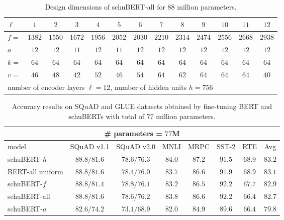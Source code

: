 \documentclass[11pt,a4paper]{article}
\begin{document}
\begin{table}[h]
\centering
\begin{tabular}{l|cccccccccccc}
\hline
$\ell$ & $1$ & $2$ & $3$ & $4$ & $5$ & $6$& $7$ &$8$ & $9$ & $10$ & $11$ & $12$\\
\hline
$f = $ & $1382$ & $1550$ & $1672$ & $1956$ & $2052$ & $2030$ & $2210$ & $2314$ & $2474$ & $2556$ & $2668$ & $2938$\\
$a = $ & $12$ & $12$ & $11$ & $12$ & $11$ & $12$ & $12$ & $12$ & $12$ & $12$ & $12$ & $12$ \\
$k= $  & $64$ & $64$ & $64$ & $64$ & $64$ & $64$ & $64$ & $64$ & $64$ & $64$ & $64$ & $64$\\
$v = $ & $46$ & $48$ & $42$ & $52$ & $46$ & $54$ & $64$ & $62$ & $64$ & $64$ & $64$ & $40$\\
\hline
\multicolumn{12}{l}{number of encoder layers $\ell=12$, number of hidden units $h=756$}\\
\end{tabular}
\caption{\label{tab:arch_88} Design dimensions of schuBERT-all for $88$ million parameters.}
\end{table}
\begin{table}[h]
\centering
\begin{tabular}{lcccccc|c}
\multicolumn{8}{c}{\# parameters = $77$M}\\
\hline
model & SQuAD v1.1 & SQuAD v2.0 & MNLI & MRPC & SST-2 & RTE & Avg\\
\hline
schuBERT-$h$ & $\pmb{88.8/81.6}$ &$\pmb{78.6/76.3}$& $\pmb{84.0}$ & $\pmb{87.2}$ & $91.5$ & $\pmb{68.9}$ & $\pmb{83.2}$\\
BERT-all uniform & $88.8/81.6$ &$78.4/76.0$& $83.7$ & $86.6$ & $91.9$ & $68.9$ & $83.1$\\
schuBERT-$f$ & $88.8/81.4$ &$78.8/76.1$& $83.2$ & $86.5$ & $\pmb{92.2}$ & $67.7$ & $82.9$\\
schuBERT-all & $88.8/81.6$ &$78.6/76.2$& $83.8$ & $86.6$ & $92.2$ & $66.4$ & $82.7$\\
schuBERT-$a$ & $82.6/74.2$ &$73.1/68.9$& $82.0$ & $84.9$ & $89.6$ & $66.4$ & $79.8$\\
\end{tabular}
\caption{\label{tab:results_77}Accuracy results on SQuAD and GLUE datasets obtained by fine-tuning BERT and schuBERTs with total of $77$ million parameters.
}
\end{table}
\end{document}
